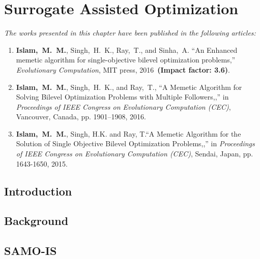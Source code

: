 \chapter{Surrogate Assisted Optimization}
\label{chapter:3}

\begin{tcolorbox}
\textit{The works presented in this chapter have been published in the following articles:}
\begin{enumerate}
\small
\item \textbf{Islam,~M.~M.}, {Singh,~H.~K.},  {Ray,~T.}, and {Sinha,~A.} ``An Enhanced memetic algorithm for single-objective bilevel optimization problems,'' {\em Evolutionary Computation}, MIT press, 2016~\textbf{(Impact factor: 3.6)}.
\item \textbf{Islam,~M.~M.}, {Singh,~H.~K.}, and {Ray,~T.}, ``A Memetic Algorithm for Solving Bilevel Optimization Problems with Multiple Followers,,'' in {\em Proceedings of IEEE Congress on Evolutionary Computation (CEC)}, Vancouver, Canada, pp. 1901--1908, 2016.
\item  \textbf{Islam,~M.~M.}, {Singh, H.K.} and {Ray, T.}``A Memetic Algorithm for the Solution of Single Objective Bilevel Optimization Problems,,'' in {\em Proceedings of IEEE Congress on Evolutionary Computation (CEC)}, Sendai, Japan, pp. 1643-1650, 2015.

\end{enumerate}

\end{tcolorbox}


\section{Introduction}
\label{sec:intro}






\section{Background}
\label{sec:back}

\section{SAMO-IS}

